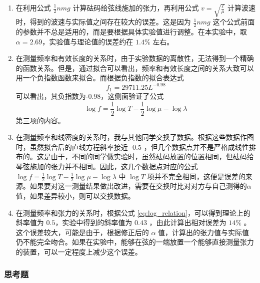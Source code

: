 \documentclass[zihao=5, UTF8]{article}
\theoremstyle{MyLineTheoremStyle} %
\theoremstyle{MyBlockTheoremStyle} %
\theoremstyle{MySubsubsectionStyle} %
\begin{document}
\begin{enumerate}
  \item 在利用公式 $\frac{1}{2} nmg$ 计算砝码给弦线施加的张力，再利用公式 $v = \sqrt{\frac{T}{\mu}}$ 计算波速时，得到的波速与实际值之间存在较大的误差。这是因为 $\frac{1}{2} nmg$ 这个公式前面的参数并不总是适用的，而是要根据具体实验值进行调整。在本实验中，取$\alpha = 2.69$，实验值与理论值的误差约在 $1.4\%$ 左右。
  \item 在测量频率和有效长度的关系时，由于实验数据的离散性，无法得到一个精确的函数关系。但是，通过拟合可以看出，频率和有效长度之间的关系大致可以用一个负指数函数来拟合。而根据负指数的拟合表达式$$f_1 = 29711.25 L^{-0.98}$$可以看出，其负指数为-0.98，这侧面验证了公式$$\log f = \frac{1}{2} \log T - \frac{1}{2} \log \mu - \log \lambda$$第三项的内容。
  \item 在测量频率和线密度的关系时，我与其他同学交换了数据。根据这些数据作图时，虽然拟合后的直线方程斜率接近 -0.5 ，但几个数据点并不是严格成线性排布的。这是由于，不同的同学做实验时，虽然砝码放置的位置相同，但砝码给琴弦施加的张力并不相同。因此，这几个数据点对应的公式$ \log f = \frac{1}{2} \log T - \frac{1}{2} \log \mu - \log \lambda$ 中 $ \log T$ 项并不完全相同，这便是误差的来源。如果要对这一测量结果做出改进，需要在交换时比对对方与自己测得的$ \alpha$ 值，如果差异较小，则可以交换数据。
  \item 在测量频率和张力的关系时，根据公式 \eqref{eq:log_relation}，可以得到理论上的斜率值为 $0.5$，实验中得到的斜率值为 $0.43$ ，由此计算出相对误差为 $14\%$ 。这个误差较大，可能是由于，根据修正后的 $\alpha$ 值，计算出的张力值与实际值仍不能完全吻合。如果在实验中，能够在弦的一端放置一个能够直接测量张力的装置，可以一定程度上减少这个误差。
\end{enumerate}

\subsubsection{思考题}
\end{document}
